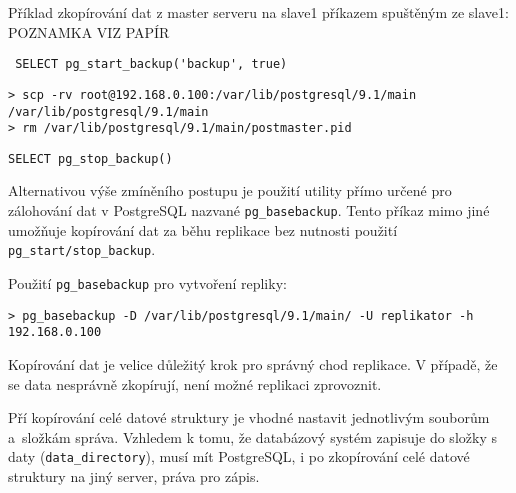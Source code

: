 Příklad zkopírování dat z master serveru na slave1 příkazem spuštěným ze slave1:
{\color{purpurova7}POZNAMKA VIZ PAPÍR} \begin{lstlisting} SELECT pg_start_backup('backup', true)
\end{lstlisting}
\begin{lstlisting}[keywordstyle=\bfseries\color{purpurova7},identifierstyle=\color{black},stringstyle=\color{black}]
> scp -rv root@192.168.0.100:/var/lib/postgresql/9.1/main /var/lib/postgresql/9.1/main
> rm /var/lib/postgresql/9.1/main/postmaster.pid
\end{lstlisting}
\begin{lstlisting}
SELECT pg_stop_backup()
\end{lstlisting}

Alternativou výše zmíněního postupu je použití utility přímo určené pro zálohování dat v PostgreSQL nazvané \texttt{pg\_basebackup}. Tento příkaz mimo jiné umožňuje kopírování dat za běhu replikace bez nutnosti použití \texttt{pg\_start/stop\_backup}.

Použití \texttt{pg\_basebackup} pro vytvoření repliky:
\begin{lstlisting}[keywordstyle=\bfseries\color{purpurova7},identifierstyle=\color{black},stringstyle=\color{black}]
> pg_basebackup -D /var/lib/postgresql/9.1/main/ -U replikator -h 192.168.0.100
\end{lstlisting}

Kopírování dat je velice důležitý krok pro správný chod replikace. V případě, že se data nesprávně zkopírují, není možné replikaci zprovoznit. 

Pří kopírování celé datové struktury je vhodné nastavit jednotlivým souborům a~složkám správa. Vzhledem k tomu, že databázový systém zapisuje do složky s daty (\texttt{data\_directory}), musí mít PostgreSQL, i po zkopírování celé datové struktury na jiný server, práva pro zápis.

